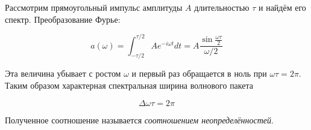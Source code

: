 Рассмотрим прямоугольный импульс амплитуды $A$ длительностью $\tau$ и найдём его спектр. Преобразование Фурье:

\begin{equation*}
    a(\omega) = \int_{- \tau / 2}^{\tau / 2} A e^{-i \omega t} d t = A \frac{\sin \frac{\omega \tau}{2}}{\omega / 2}
\end{equation*}

\noindent
Эта величина убывает с ростом $\omega$ и первый раз обращается в ноль при $\omega \tau = 2 \pi$. Таким образом характерная спектральная ширина волнового пакета

\begin{equation}
    \Delta \omega \tau = 2 \pi
\end{equation}

\noindent
Полученное соотношение называется \textit{соотношением неопределённостей}.